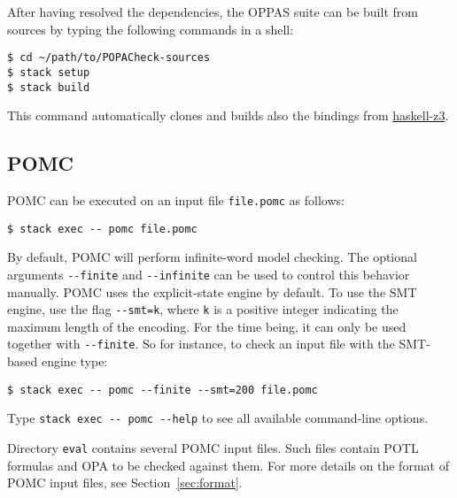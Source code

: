 \documentclass[9pt,a4paper]{article}
\begin{document}
After having resolved the dependencies, the OPPAS suite can be built from sources by typing the following commands in a shell:
\begin{verbatim}
$ cd ~/path/to/POPACheck-sources
$ stack setup
$ stack build
\end{verbatim}
This command automatically clones and builds also the bindings from \href{https://github.com/michiari/haskell-z3}{haskell-z3}.

\subsection{POMC}

POMC can be executed on an input file \verb|file.pomc| as follows:
\begin{verbatim}
$ stack exec -- pomc file.pomc
\end{verbatim}
By default, POMC will perform infinite-word model checking.
The optional arguments \verb|--finite| and \verb|--infinite|
can be used to control this behavior manually.
POMC uses the explicit-state engine by default.
To use the SMT engine, use the flag \verb|--smt=k|,
where \verb|k| is a positive integer indicating the maximum length of the encoding.
For the time being, it can only be used together with \verb|--finite|.
So for instance, to check an input file with the SMT-based engine type:
\begin{verbatim}
$ stack exec -- pomc --finite --smt=200 file.pomc
\end{verbatim}
Type \verb|stack exec -- pomc --help| to see all available command-line options.

Directory \verb|eval| contains several POMC input files. Such files
contain POTL formulas and OPA to be checked against them. For more
details on the format of POMC input files, see
Section~\ref{sec:format}.
\end{document}
